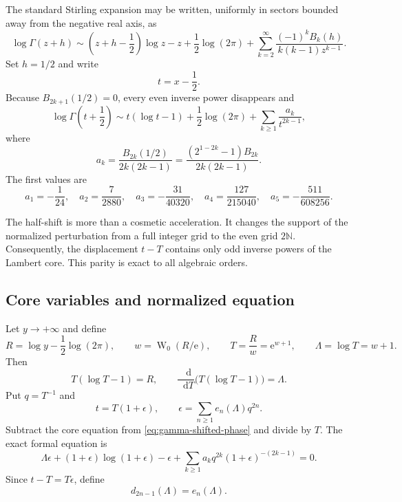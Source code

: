 \documentclass[11pt,oneside]{article}
\theoremstyle{plain}
\theoremstyle{definition}
\theoremstyle{remark}
\newcommand{\W}{\operatorname{W}}
\newcommand{\e}{\mathrm{e}}
\newcommand{\dd}{\mathop{}\!\mathrm{d}}
\newcommand{\N}{\mathbb{N}}
\begin{document}
The standard Stirling expansion may be written, uniformly in sectors bounded
away from the negative real axis, as
\begin{equation}
 \log\Gamma(z+h)
 \sim\left(z+h-\frac12\right)\log z-z+\frac12\log(2\pi)
 +\sum_{k=2}^{\infty}
 \frac{(-1)^kB_k(h)}{k(k-1)z^{k-1}}.
 \label{eq:shifted-stirling-general}
\end{equation}
Set \(h=1/2\) and write
\begin{equation}
 t=x-\frac12.
 \label{eq:gamma-half-shift}
\end{equation}
Because \(B_{2k+1}(1/2)=0\), every even inverse power disappears and
\begin{equation}
 \log\Gamma\!\left(t+\frac12\right)
 \sim t(\log t-1)+\frac12\log(2\pi)
 +\sum_{k\ge1}\frac{a_k}{t^{2k-1}},
 \label{eq:gamma-shifted-phase}
\end{equation}
where
\begin{equation}
 a_k=\frac{B_{2k}(1/2)}{2k(2k-1)}
 =\frac{(2^{1-2k}-1)B_{2k}}{2k(2k-1)}.
 \label{eq:gamma-ak}
\end{equation}
The first values are
\begin{equation}
 a_1=-\frac1{24},\quad
 a_2=\frac7{2880},\quad
 a_3=-\frac{31}{40320},\quad
 a_4=\frac{127}{215040},\quad
 a_5=-\frac{511}{608256}.
 \label{eq:gamma-ak-first}
\end{equation}

The half-shift is more than a cosmetic acceleration.  It changes the support
of the normalized perturbation from a full integer grid to the even grid
\(2\N\).  Consequently, the displacement \(t-T\) contains only odd inverse
powers of the Lambert core.  This parity is exact to all algebraic orders.

\subsection{Core variables and normalized equation}

Let \(y\to+\infty\) and define
\begin{equation}
 R=\log y-\frac12\log(2\pi),
 \qquad
 w=\W_0(R/\e),
 \qquad
 T=\frac{R}{w}=\e^{w+1},
 \qquad
 \Lambda=\log T=w+1.
 \label{eq:gamma-core-full}
\end{equation}
Then
\begin{equation}
 T(\log T-1)=R,
 \qquad
 \frac{\dd}{\dd T}\bigl(T(\log T-1)\bigr)=\Lambda.
 \label{eq:gamma-core-identities}
\end{equation}
Put \(q=T^{-1}\) and
\begin{equation}
 t=T(1+\epsilon),
 \qquad
 \epsilon=\sum_{n\ge1}e_n(\Lambda)q^{2n}.
 \label{eq:gamma-epsilon}
\end{equation}
Subtract the core equation from \cref{eq:gamma-shifted-phase} and divide by
\(T\).  The exact formal equation is
\begin{equation}
 \Lambda\epsilon+
 (1+\epsilon)\log(1+\epsilon)-\epsilon
 +\sum_{k\ge1}a_kq^{2k}(1+\epsilon)^{-(2k-1)}=0.
 \label{eq:gamma-normalized}
\end{equation}
Since \(t-T=T\epsilon\), define
\begin{equation}
 d_{2n-1}(\Lambda)=e_n(\Lambda).
 \label{eq:gamma-d-e}
\end{equation}
\end{document}
